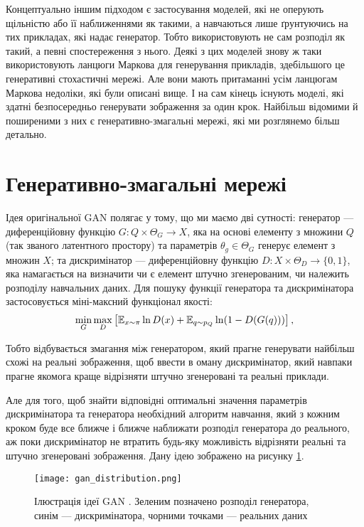 Концептуально іншим підходом є застосування моделей, які
не оперують щільністю або її наближеннями як такими, а
навчаються лише ґрунтуючись на тих прикладах, які надає
генератор. Тобто використовують не сам розподіл як такий, а
певні спостереження з нього. Деякі з цих моделей знову ж таки
використовують ланцюги Маркова для генерування прикладів,
здебільшого це генеративні стохастичні мережі. Але вони мають
притаманні усім ланцюгам Маркова недоліки, які були описані вище.
І на сам кінець існують моделі, які здатні безпосередньо
генерувати зображення за один крок. Найбільш відомими й поширеними з них
є генеративно-змагальні мережі, які ми розглянемо більш детально.

\section{Генеративно-змагальні мережі}

Ідея оригінальної GAN  \cite{goodfellow2014generative}
полягає у тому, що ми маємо дві сутності:
генератор --- диференційовну функцію $G: Q \times \Theta_G \rightarrow X$, яка
на основі елементу з множини $Q$ (так званого латентного простору)
та параметрів $\theta_g \in \Theta_G$
генерує елемент з множин $X$; та дискримінатор
--- диференційовну функцію $D: X \times \Theta_D \rightarrow \{0, 1\}$, яка
намагається на визначити чи є елемент штучно згенерованим, чи
належить розподілу навчальних даних. Для пошуку функції
генератора та дискримінатора застосовується міні-максний функціонал якості:
\begin{equation} \label{eq:gan_criterion}
    \min\limits_{G}\max\limits_{D} \left[
        \operatorname{\mathbb{E}}_{x \sim \pi} \ln D(x) +
        \operatorname{\mathbb{E}}_{q \sim p_{Q}} \ln (1 - D(G(q))) \right],
\end{equation}

Тобто відбувається змагання між генератором, який прагне генерувати найбільш
схожі на реальні зображення, щоб ввести в оману дискримінатор,
який навпаки прагне якомога краще відрізняти штучно згенеровані та
реальні приклади.

Але для того, щоб знайти відповідні оптимальні значення
параметрів дискримінатора та генератора необхідний алгоритм навчання,
який з кожним кроком буде все ближче і ближче наближати розподіл
генератора до реального, аж поки дискримінатор не втратить будь-яку можливість
відрізняти реальні та штучно згенеровані зображення. Дану ідею
зображено на рисунку \ref{fig:gan}.

\begin{figure}[h]
    \centering
    \texttt{[image: gan\_distribution.png]}
    \caption{Ілюстрація ідеї GAN \cite{goodfellow2014generative}.
        Зеленим позначено розподіл генератора,
        синім --- дискримінатора,
        чорними точками --- реальних даних}
    \label{fig:gan}
\end{figure}

